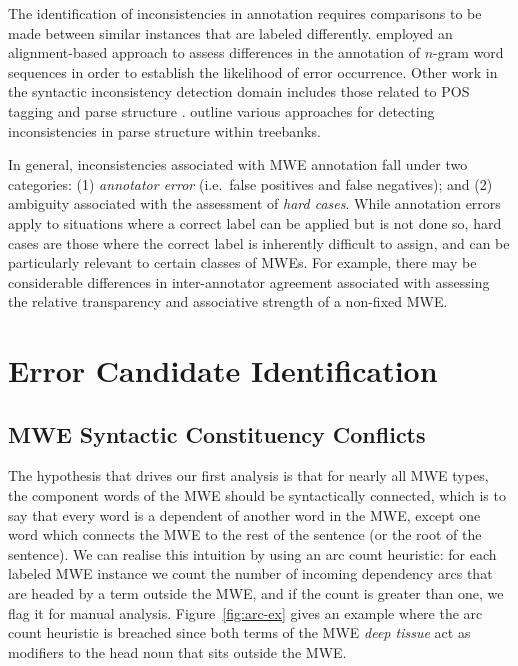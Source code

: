 \documentclass[output=paper
,modfonts
,nonflat]{langsci/langscibook}
\newcommand{\lex}[1]{\textit{#1}\xspace}
\newcommand{\ngram}[1][]{$n$-gram{#1}\xspace}
\newcommand{\figureref}[1]{Figure~\ref{#1}\xspace}
\begin{document}
The identification of inconsistencies in annotation requires comparisons to be made between similar instances that are labeled differently. \citet{boyd-et-al:07a} employed an alignment-based approach to assess differences in the annotation of \ngram word sequences in order to establish the likelihood of error occurrence.  Other work in the syntactic inconsistency detection domain includes those related to POS tagging \citep{loftsson2009correcting,Eskin:2000:DEW:974305.974325,ma2001line} and parse structure \citep{ule2004unexpected,kato2010correcting}. \citet{Dickinson03} outline various approaches for detecting inconsistencies in parse structure within treebanks. 

In general, inconsistencies associated with MWE annotation fall under two categories: (1) \lex{annotator error} (i.e.\ false positives and false negatives); and (2) ambiguity associated with the assessment of \lex{hard cases}. While annotation errors apply to situations where a correct label can be applied but is not done so, hard cases are those where the correct label is inherently difficult to assign, and can be particularly relevant to certain classes of MWEs. For example, there may be considerable differences in inter-annotator agreement associated with assessing the relative transparency and associative strength of a non-fixed MWE.  

\section{Error Candidate Identification}

\subsection{MWE Syntactic Constituency Conflicts}

The hypothesis that drives our first analysis is that for nearly all MWE types, the component words of the MWE should be syntactically connected, which is to say that every word is a dependent of another word in the MWE, except one word which connects the MWE to the rest of the sentence (or the root of the sentence). We can realise this intuition by using an arc count heuristic: for each labeled MWE instance we count the number of incoming dependency arcs that are headed by a term outside the MWE, and if the count is greater than one, we flag it for manual analysis. \figureref{fig:arc-ex} gives an example where the arc count heuristic is breached since both terms of the MWE \lex{deep tissue} act as modifiers to the head noun that sits outside the MWE.
\end{document}
